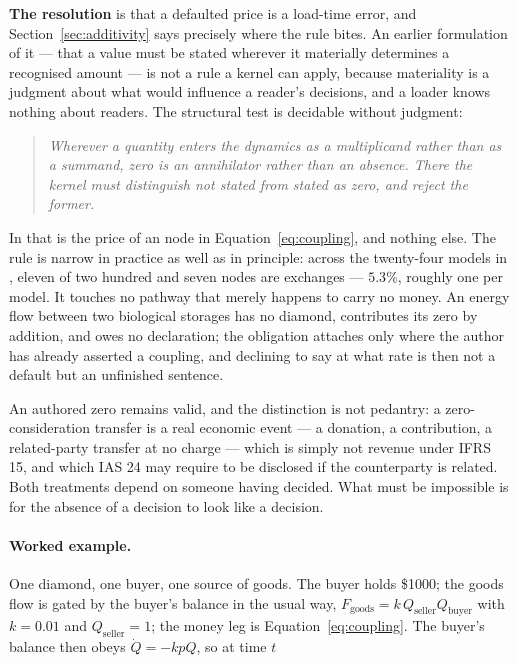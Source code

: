 \documentclass[11pt,a4paper]{article}
\begin{document}
\textbf{The resolution} is that a defaulted price is a load-time error, and Section~\ref{sec:additivity} says precisely where the rule bites. An earlier formulation of it --- that a value must be stated wherever it materially determines a recognised amount --- is not a rule a kernel can apply, because materiality is a judgment about what would influence a reader's decisions, and a loader knows nothing about readers. The structural test is decidable without judgment:

\begin{quote}
\emph{Wherever a quantity enters the dynamics as a multiplicand rather than as a summand, zero is an annihilator rather than an absence. There the kernel must distinguish \emph{not stated} from \emph{stated as zero}, and reject the former.}
\end{quote}

In \gssk{} that is the price of an  node in Equation~\eqref{eq:coupling}, and nothing else. The rule is narrow in practice as well as in principle: across the twenty-four models in , eleven of two hundred and seven nodes are exchanges --- $5.3\%$, roughly one per model. It touches no pathway that merely happens to carry no money. An energy flow between two biological storages has no diamond, contributes its zero by addition, and owes no declaration; the obligation attaches only where the author has already asserted a coupling, and declining to say at what rate is then not a default but an unfinished sentence.

An authored zero remains valid, and the distinction is not pedantry: a zero-consideration transfer is a real economic event --- a donation, a contribution, a related-party transfer at no charge --- which is simply not revenue under IFRS 15, and which IAS 24 may require to be disclosed if the counterparty is related. Both treatments depend on someone having decided. What must be impossible is for the absence of a decision to look like a decision.

\paragraph{Worked example.} One diamond, one buyer, one source of goods. The buyer holds \$1000; the goods flow is gated by the buyer's balance in the usual way, $F_{\text{goods}} = k\,Q_{\text{seller}}Q_{\text{buyer}}$ with $k = 0.01$ and $Q_{\text{seller}} = 1$; the money leg is Equation~\eqref{eq:coupling}. The buyer's balance then obeys $\dot{Q} = -kpQ$, so at time $t$
\end{document}
